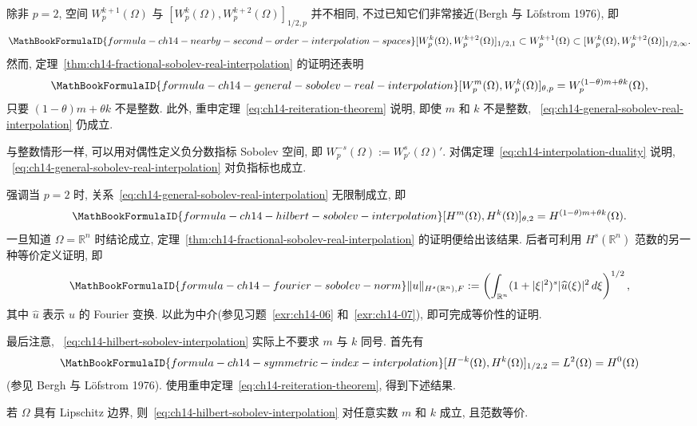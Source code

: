 除非 $p=2$, 空间 $W_p^{k+1}(\Omega)$ 与 $[W_p^k(\Omega),W_p^{k+2}(\Omega)]_{1/2,p}$ 并不相同, 不过已知它们非常接近(Bergh 与 Löfstrom 1976), 即
\[
\MathBookFormulaID{formula-ch14-nearby-second-order-interpolation-spaces}
[W_p^k(\Omega),W_p^{k+2}(\Omega)]_{1/2,1}
\subset W_p^{k+1}(\Omega)
\subset [W_p^k(\Omega),W_p^{k+2}(\Omega)]_{1/2,\infty}.
\]
然而, 定理~\ref{thm:ch14-fractional-sobolev-real-interpolation} 的证明还表明
\begin{equation}
\MathBookFormulaID{formula-ch14-general-sobolev-real-interpolation}
\label{eq:ch14-general-sobolev-real-interpolation}
[W_p^m(\Omega),W_p^k(\Omega)]_{\theta,p}
=W_p^{(1-\theta)m+\theta k}(\Omega),
\end{equation}
只要 $(1-\theta)m+\theta k$ 不是整数. 此外, 重申定理~\eqref{eq:ch14-reiteration-theorem} 说明, 即使 $m$ 和 $k$ 不是整数, ~\eqref{eq:ch14-general-sobolev-real-interpolation} 仍成立.

与整数情形一样, 可以用对偶性定义负分数指标 Sobolev 空间, 即 $W_p^{-s}(\Omega):=W_{p'}^s(\Omega)'$. 对偶定理~\eqref{eq:ch14-interpolation-duality} 说明, ~\eqref{eq:ch14-general-sobolev-real-interpolation} 对负指标也成立.

强调当 $p=2$ 时, 关系~\eqref{eq:ch14-general-sobolev-real-interpolation} 无限制成立, 即
\begin{equation}
\MathBookFormulaID{formula-ch14-hilbert-sobolev-interpolation}
\label{eq:ch14-hilbert-sobolev-interpolation}
[H^m(\Omega),H^k(\Omega)]_{\theta,2}=H^{(1-\theta)m+\theta k}(\Omega).
\end{equation}
一旦知道 $\Omega=\mathbb R^n$ 时结论成立, 定理~\ref{thm:ch14-fractional-sobolev-real-interpolation} 的证明便给出该结果. 后者可利用 $H^s(\mathbb R^n)$ 范数的另一种等价定义证明, 即
\begin{equation}
\MathBookFormulaID{formula-ch14-fourier-sobolev-norm}
\label{eq:ch14-fourier-sobolev-norm}
\|u\|_{H^s(\mathbb R^n),F}
:=\left(\int_{\mathbb R^n}(1+|\xi|^2)^s|\widehat u(\xi)|^2\,d\xi\right)^{1/2},
\end{equation}
其中 $\widehat u$ 表示 $u$ 的 Fourier 变换. 以此为中介(参见习题~\ref{exr:ch14-06} 和~\ref{exr:ch14-07}), 即可完成等价性的证明.

最后注意, ~\eqref{eq:ch14-hilbert-sobolev-interpolation} 实际上不要求 $m$ 与 $k$ 同号. 首先有
\[
\MathBookFormulaID{formula-ch14-symmetric-index-interpolation}
[H^{-k}(\Omega),H^k(\Omega)]_{1/2,2}=L^2(\Omega)=H^0(\Omega)
\]
(参见 Bergh 与 Löfstrom 1976). 使用重申定理~\eqref{eq:ch14-reiteration-theorem}, 得到下述结果.
\begin{Theorem}
\label{thm:ch14-arbitrary-real-sobolev-interpolation}
若 $\Omega$ 具有 Lipschitz 边界, 则~\eqref{eq:ch14-hilbert-sobolev-interpolation} 对任意实数 $m$ 和 $k$ 成立, 且范数等价.
\end{Theorem}
